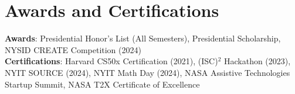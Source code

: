 \section{Awards and Certifications}
    \begin{itemize}[leftmargin=0.15in, label={}]
	\small{\item{
		\textbf{Awards}{: Presidential Honor’s List (All Semesters), Presidential Scholarship, NYSID CREATE Competition (2024)} \\
		\textbf{Certifications}{: Harvard CS50x Certification (2021), (ISC)$^2$ Hackathon (2023), NYIT SOURCE (2024), NYIT Math Day (2024), NASA Assistive Technologies Startup Summit, NASA T2X Certificate of Excellence}
	}}
    \end{itemize}

    